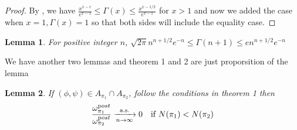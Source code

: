 \documentclass[aoas,preprint]{imsart}
\newtheorem{lemma}{Lemma}
\begin{document}
\begin{proof}
By \citep{ineq},  we have $\frac{x^{x - c}}{e^{x - 1}} \leq \Gamma(x) \leq \frac{x^{x-1/2}}{e^{x - 1}}$ for $x > 1$ and now we added the case when $x = 1, \Gamma(x) = 1$ so that both sides will include the equality case. 
\end{proof}


\begin{lemma}
For positive integer $n$, $\sqrt{2\pi} n^{n + 1/2}e^{-n} \leq \Gamma(n + 1) \leq e n^{n + 1/2}e^{-n}$ 
\end{lemma}



We have another two lemmas and theorem 1 and 2 are just proporsition of the lemma
\begin{lemma}
 If $(\phi, \psi) \in A_{\pi_1} \cap A_{\pi_2}$, follow the conditions in theorem 1 then 
 \begin{eqnarray*}
    \frac{\omega_{\pi_1}^{\text post}}{\omega_{\pi_2}^{\text post}} \xrightarrow[n\rightarrow\infty]{\text{a.s.}} 0 \quad \text{if } N(\pi_1) < N(\pi_2)\\
 \end{eqnarray*}
\end{lemma}
\end{document}
